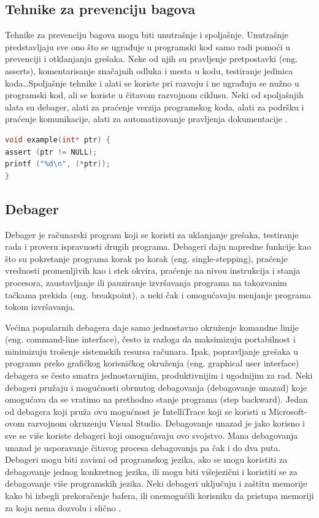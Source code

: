 \documentclass[a4paper]{article}
\begin{document}
\subsection{Tehnike za prevenciju bagova}
\label{subsec:Tehnike za prevenciju bagova}

Tehnike za prevenciju bagova mogu biti unutrašnje i spoljašnje. Unutrašnje predstavljaju sve ono što se ugrađuje u programski kod samo radi pomoći u prevenciji i otklanjanju grešaka. Neke od njih su pravljenje pretpostavki (eng. asserts), komentarisanje značajnih odluka i mesta u kodu, testiranje jedinica koda\ldots Spoljašnje tehnike i alati se koriste pri razvoju i ne ugrađuju se nužno u programski kod, ali se koriste u čitavom razvojnom ciklusu. Neki od spoljašnjih alata su debager, alati za praćenje verzija programskog koda, alati za podršku i praćenje komunikacije, alati za automatizovanje pravljenja dokumentacije \cite{bagovi_smalkov}.  \\

\begin{lstlisting}[language=C,caption=Primer upotrebe assert naredbe]
void example(int* ptr) {
assert (ptr != NULL);
printf ("%d\n", (*ptr));
}
\end{lstlisting}


\subsection{Debager}
\label{subsec:Debager}

Debager je računarski program koji se koristi za uklanjanje grešaka, testiranje rada i proveru ispravnosti drugih programa. Debageri daju napredne funkcije kao što su pokretanje programa korak po korak (eng. single-stepping), praćenje vrednosti promenljivih kao i stek okvira, praćenje na nivou instrukcija i stanja procesora, zaustavljanje ili pauziranje izvršavanja programa na takozvanim tačkama prekida (eng. breakpoint), a neki čak i omogućavaju menjanje programa tokom izvršavanja.

Većina popularnih debagera daje samo jednostavno okruženje komandne linije (eng. command-line interface), često iz razloga da maksimizuju portabilnost i minimizuju trošenje sistemskih resursa računara. Ipak, popravljanje grešaka u programu preko grafičkog korisničkog okruženja (eng. graphical user interface) debagera se često smatra jednostavnijim, produktivnijim i ugodnijim za rad. Neki debageri pružaju i mogućnosti obrnutog debagovanja (debagovanje unazad) koje omogućava da se vratimo na prethodno stanje programa (step backward). Jedan od debagera koji pruža ovu mogućnost je IntelliTrace koji se koristi u Microsoft-ovom razvojnom okruzenju Visual Studio. Debagovanje unazad je jako korisno i sve se više koriste debageri koji omogućavaju ovo svojstvo. Mana debagovanja unazad je usporavanje čitavog procesa debagovanja pa čak i do dva puta. Debageri mogu biti zavisni od programskog jezika, ako se mogu koristiti za debagovanje jednog konkretnog jezika, ili mogu biti višejezični i koristiti se za debagovanje više programskih jezika. Neki debageri uključuju i zaštitu memorije kako bi izbegli prekoračenje bafera, ili onemogućili korisniku da pristupa memoriji za koju nema dozvolu i slično \cite{ssq_debug_def}.
\end{document}
